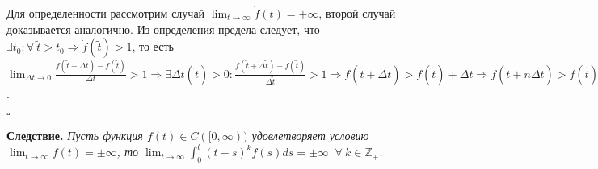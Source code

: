 \documentclass[12pt, a4paper]{article}
\begin{document}
\quad Для определенности рассмотрим случай $\displaystyle\lim_{t \rightarrow \infty}\dot{f}(t) = +\infty$, второй случай доказывается аналогично. Из определения предела следует, что $\exists t_0 : \forall \: \widetilde{t} > t_0 \Rightarrow \dot{f}(\widetilde{t}) > 1$, то есть \\ $\displaystyle\lim_{\Delta t \rightarrow 0}\frac{f(\widetilde{t} + \Delta t) - f(\widetilde{t})}{\Delta t} > 1 \Rightarrow \exists \Delta \widetilde{t}(\widetilde{t}) > 0 : \frac{f(\widetilde{t} + \Delta \widetilde{t}) - f(\widetilde{t})}{\Delta \widetilde{t}} > 1 \Rightarrow f(\widetilde{t} + \Delta \widetilde{t}) > f(\widetilde{t}) + \Delta \widetilde{t} \Rightarrow f(\widetilde{t} + n\Delta \widetilde{t}) > f(\widetilde{t}) + n\Delta \widetilde{t}, \;\; 	\forall \: n \in \mathds{N} \Rightarrow \lim_{t \rightarrow \infty}f(t) = \lim_{n \rightarrow \infty} f(\widetilde{t} + n\Delta \widetilde{t}) \geq f(\widetilde{t}) + \Delta\widetilde{t} \lim_{n \rightarrow \infty}n = +\infty \Rightarrow \lim_{t \rightarrow \infty}f(t) = +\infty$.
\begin{flushright} $\square$ \end{flushright}

\begin{comment}
\quad \textbf{Предложение 2.} \textit{Пусть функция $f(t) \in C^1([0, \infty)) : \displaystyle\lim_{t \rightarrow \infty}f(t) = 0. \\ \exists t_0 : \forall \: t > t_0 \;\; f(t)$ - монотонна $\Rightarrow \displaystyle\lim_{t \rightarrow \infty}\dot{f}(t) = 0.$}

\begin{center}
\textbf{Доказательство}
\end{center}

\quad Для определенности рассмотрим случай, когда $\exists t_0 : \forall \: t > t_0 \;\; f(t)$ - монотоннo убывает, то есть $\exists t_0 : \forall \: \widetilde{t} > t_0 \Rightarrow \dot{f}(\widetilde{t}) < 0$. Предположим, что $\displaystyle \exists \delta > 0 : \forall t_1>t_0 \;\; \exists \widetilde{t} > t_1 : \dot{f}(\widetilde{t}) < -\delta \Rightarrow \\ \forall \: n \in \mathds{N} \lim_{\Delta t \rightarrow 0}\frac{f(\widetilde{t} + n\Delta t) - f(\widetilde{t})}{n\Delta t} <-\delta \Rightarrow \exists\Delta \widetilde{t}(n, \widetilde{t}) > 0 : f(\widetilde{t} + n\Delta t) < f(\widetilde{t}) - n\delta\Delta\widetilde{t} \Rightarrow \\ \lim_{t \rightarrow \infty}f(t) = \lim_{n \rightarrow \infty} f(\widetilde{t} + n\Delta \widetilde{t}) < f(\widetilde{t}) - \lim_{n \rightarrow \infty}n\Delta \widetilde{t} = +\infty$

\end{comment}
\quad \textbf{Следствие.} \textit{Пусть функция $f(t) \in C([0, \infty))$ удовлетворяет условию $\displaystyle\lim_{t \rightarrow \infty}f(t) = \pm \infty$, то $\displaystyle\lim_{t \rightarrow \infty}\int_0^t(t-s)^k f(s)ds = \pm \infty \;\; \forall \: k \in \mathds{Z_+}$.}
\end{document}
